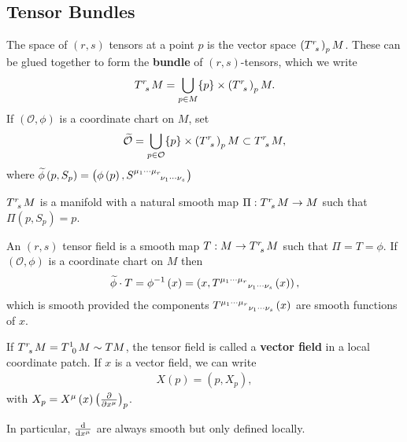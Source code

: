 \subsection{Tensor Bundles}

\begin{definition}
    The space of $\left( r,s \right) $ tensors at a point $p$ is the vector space $\left( \tensor{T}{^{r}_s} \right)_p M$. These can be glued together to form the \textbf{bundle} of $\left( r,s \right) $-tensors, which we write 
    \begin{align}
        \tensor{T}{^{r}_s}M = \bigcup_{p \in M} \{p\} \times \left( \tensor{T}{^{r}_s} \right)_p M 
    .\end{align}
    If $\left( \mathcal{O},\phi \right) $ is a coordinate chart on $M$, set
    \begin{align}
        \widetilde{\mathcal{O}} = \bigcup_{p \in \mathcal{O}} \{p\}  \times \left( \tensor{T}{^{r}_{s}} \right)_p M \subset \tensor{T}{^{r}_{s}}M 
    ,\end{align}
    where $\widetilde{\phi}\left( p, S_p \right) = \left( \phi \left( p \right) , \tensor{S}{^{\mu_1 \cdots \mu_r}_{\nu_1 \cdots \nu_s}} \right)$
\end{definition}

$\tensor{T}{^{r}_s}M$ is a manifold with a natural smooth map $\Pi : \tensor{T}{^{r}_s}M \to M$ such that $\Pi \left( p, S_p \right) = p$.

\begin{definition}
    An $\left( r,s \right) $ tensor field is a smooth map $T : M \to \tensor{T}{^{r}_s} M$ such that $\Pi = T = \phi$. If $\left( \mathcal{O}, \phi \right) $ is a coordinate chart on $M$ then
    \begin{align}
        \widetilde{\phi} \cdot T = \phi^{-1}\left( x \right) = \left( x, \tensor{T}{^{\mu_1 \cdots \mu_r}}_{\nu_1 \cdots \nu_s}\left( x \right)  \right) 
    ,\end{align}
    which is smooth provided the components $\tensor{T}{^{\mu_1 \cdots \mu_r}}_{\nu_1 \cdots \nu_s}\left( x \right)$ are smooth functions of $x$.
\end{definition}

If $\tensor{T}{^{r}_s} M = \tensor{T}{^{1}_0} M \sim TM$, the tensor field is called a \textbf{vector field} in a local coordinate patch. If $x$ is a vector field, we can write
\begin{align}
    X \left( p \right) = \left( p, X_p \right) 
,\end{align}
with $X_p = X^{\mu} \left( x \right) \left( \pdv{x^{\mu}} \right)_p $.

In particular, $\dv{x^{\mu}}$ are always smooth but only defined locally.


